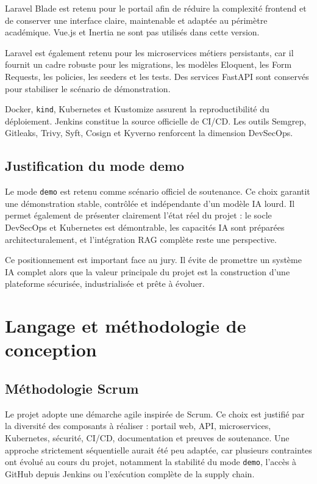 Laravel Blade est retenu pour le portail afin de réduire la complexité frontend et de conserver une interface claire, maintenable et adaptée au périmètre académique. Vue.js et Inertia ne sont pas utilisés dans cette version.

Laravel est également retenu pour les microservices métiers persistants, car il fournit un cadre robuste pour les migrations, les modèles Eloquent, les Form Requests, les policies, les seeders et les tests. Des services FastAPI sont conservés pour stabiliser le scénario de démonstration.

Docker, \texttt{kind}, Kubernetes et Kustomize assurent la reproductibilité du déploiement. Jenkins constitue la source officielle de CI/CD. Les outils Semgrep, Gitleaks, Trivy, Syft, Cosign et Kyverno renforcent la dimension DevSecOps.

\subsection{Justification du mode demo}

Le mode \texttt{demo} est retenu comme scénario officiel de soutenance. Ce choix garantit une démonstration stable, contrôlée et indépendante d'un modèle IA lourd. Il permet également de présenter clairement l'état réel du projet : le socle DevSecOps et Kubernetes est démontrable, les capacités IA sont préparées architecturalement, et l'intégration RAG complète reste une perspective.

Ce positionnement est important face au jury. Il évite de promettre un système IA complet alors que la valeur principale du projet est la construction d'une plateforme sécurisée, industrialisée et prête à évoluer.

\section{Langage et méthodologie de conception}

\subsection{Méthodologie Scrum}

Le projet adopte une démarche agile inspirée de Scrum. Ce choix est justifié par la diversité des composants à réaliser : portail web, API, microservices, Kubernetes, sécurité, CI/CD, documentation et preuves de soutenance. Une approche strictement séquentielle aurait été peu adaptée, car plusieurs contraintes ont évolué au cours du projet, notamment la stabilité du mode \texttt{demo}, l'accès à GitHub depuis Jenkins ou l'exécution complète de la supply chain.

